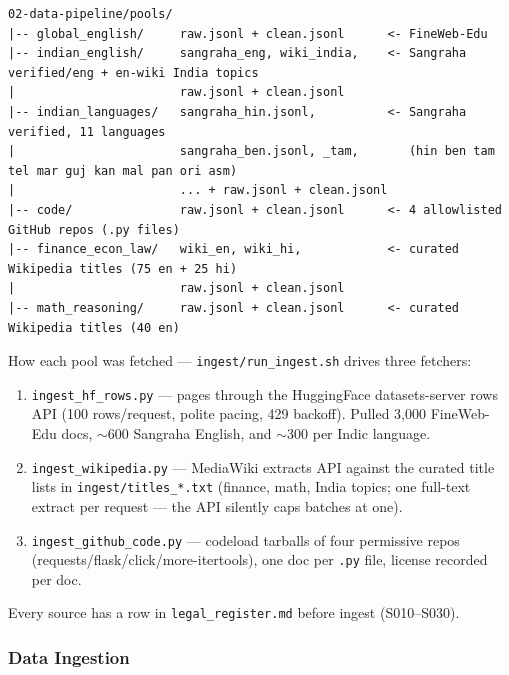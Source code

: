 \begin{lstlisting}[style=shadedpython,language={},basicstyle=\scriptsize\ttfamily,breaklines=true]
02-data-pipeline/pools/
|-- global_english/     raw.jsonl + clean.jsonl      <- FineWeb-Edu
|-- indian_english/     sangraha_eng, wiki_india,    <- Sangraha verified/eng + en-wiki India topics
|                       raw.jsonl + clean.jsonl
|-- indian_languages/   sangraha_hin.jsonl,          <- Sangraha verified, 11 languages
|                       sangraha_ben.jsonl, _tam,       (hin ben tam tel mar guj kan mal pan ori asm)
|                       ... + raw.jsonl + clean.jsonl
|-- code/               raw.jsonl + clean.jsonl      <- 4 allowlisted GitHub repos (.py files)
|-- finance_econ_law/   wiki_en, wiki_hi,            <- curated Wikipedia titles (75 en + 25 hi)
|                       raw.jsonl + clean.jsonl
|-- math_reasoning/     raw.jsonl + clean.jsonl      <- curated Wikipedia titles (40 en)
\end{lstlisting}

How each pool was fetched --- \texttt{ingest/run\_ingest.sh} drives three
fetchers:
\begin{enumerate}
    \setlength{\itemsep}{0pt}
  \item \texttt{ingest\_hf\_rows.py} --- pages through the HuggingFace
    datasets-server rows API (100 rows/request, polite pacing, 429
    backoff). Pulled 3{,}000 FineWeb-Edu docs, $\sim$600 Sangraha
    English, and $\sim$300 per Indic language.
  \item \texttt{ingest\_wikipedia.py} --- MediaWiki extracts API against
    the curated title lists in \texttt{ingest/titles\_*.txt}
    (finance, math, India topics; one full-text extract per request
    --- the API silently caps batches at one).
  \item \texttt{ingest\_github\_code.py} --- codeload tarballs of four
    permissive repos (requests/flask/click/more-itertools), one doc
    per \texttt{.py} file, license recorded per doc.
\end{enumerate}
Every source has a row in \texttt{legal\_register.md} before ingest
(S010--S030).

\subsubsection{Data Ingestion}

